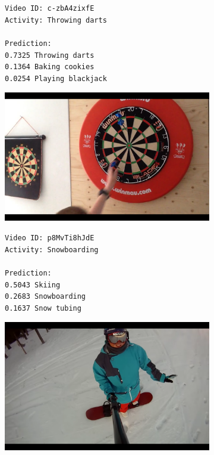 \begin{figure}[H]
\centering
\begin{subfigure}[b]{.4\textwidth}
  \texttt{Video ID: c-zbA4zixfE \\
  Activity: Throwing darts \\
  \\
  Prediction: \\
  0.7325	Throwing darts \\
  0.1364	Baking cookies \\
  0.0254	Playing blackjack \\}
\end{subfigure}%
\begin{subfigure}[b]{.6\textwidth}
  \centering
\includegraphics[width=0.95\linewidth]{img/results/activity_classification/results_visualization_classification_5}
\end{subfigure}

\begin{subfigure}[b]{.4\textwidth}
  \texttt{Video ID: p8MvTi8hJdE \\
    Activity: Snowboarding \\
    \\
    Prediction: \\
    0.5043	Skiing \\
    0.2683	Snowboarding \\
    0.1637	Snow tubing \\}
\end{subfigure}%
\begin{subfigure}[b]{.6\textwidth}
  \centering
\includegraphics[width=0.95\linewidth]{img/results/activity_classification/results_visualization_classification_6}
\end{subfigure}


\end{figure}
